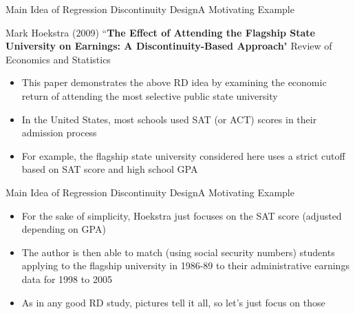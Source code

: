 \documentclass[dvipsnames,hyperref={pdfpagelabels=false}]{beamer}
\begin{document}
\begin{frame}{Main Idea of Regression Discontinuity Design}{A Motivating Example}

Mark Hoekstra (2009) ``\textbf{The Effect of Attending the Flagship State University on Earnings: A Discontinuity-Based Approach}" Review of Economics and Statistics

\begin{itemize}

\item This paper demonstrates the above RD idea by examining the economic return of attending the most selective public state
university

\vspace{0.2cm}
\item In the United States, most schools used SAT (or ACT) scores in
their admission process
\vspace{0.2cm}
\item For example, the flagship state university considered here uses a strict cutoff based on SAT score and high school GPA

\end{itemize}
\end{frame}

\begin{frame}{Main Idea of Regression Discontinuity Design}{A Motivating Example}
\begin{itemize}

\item For the sake of simplicity, Hoekstra just focuses on the SAT score (adjusted depending on GPA)
\vspace{0.2cm}
\item The author is then able to match (using social security numbers) students applying to the flagship university in 1986-89 to their
administrative earnings data for 1998 to 2005
\vspace{0.2cm}
\item As in any good RD study, pictures tell it all, so let's just focus on
those

\end{itemize}
\end{frame}
\end{document}
